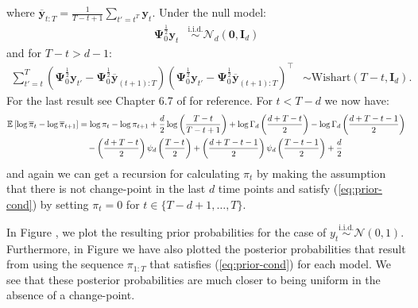 \normalsize
where $\overline{\mathbf{y}}_{t:T} = \frac{1}{T-t+1}\sum_{t'=t^T}\mathbf{y}_t$. Under the null model:
\begin{align*}
    \boldsymbol{\Psi}_0^{\frac{1}{2}}\mathbf{y}_t &\overset{\text{i.i.d.}}{\sim}\mathcal{N}_d(\mathbf{0},\mathbf{I}_d)
\end{align*}
and for $T-t>d-1$:
\begin{align*}
    \sum_{t'=t}^{T} (\boldsymbol{\Psi}^{\frac{1}{2}}_{0}\mathbf{y}_{t'} - \boldsymbol{\Psi}^{\frac{1}{2}}_{0}\overline{\mathbf{y}}_{(t+1):T})(\boldsymbol{\Psi}^{\frac{1}{2}}_{0}\mathbf{y}_{t'} - \boldsymbol{\Psi}^{\frac{1}{2}}_{0}\overline{\mathbf{y}}_{(t+1):T})^\intercal &\sim \text{Wishart}(T-t,\mathbf{I}_d).
\end{align*}
For the last result see Chapter 6.7 of \cite{Chatfield80} for reference.  For $t < T-d$ we now have:
\begin{align*}
    \mathbb{E}\left[\log\overline{\pi}_t - \log \overline{\pi}_{t+1} \right] &= \log \pi_t- \log \pi_{t+1} + \frac{d}{2}\log\left(\frac{T-t}{T-t+1}\right) +\log \Gamma_d\left(\frac{d + T-t}{2}\right) - \log \Gamma_d\left(\frac{d + T-t-1}{2}\right) \\
    &\quad - \left(\frac{d + T - t}{2}\right)\psi_d\left(\frac{T-t}{2}\right) + \left(\frac{d + T - t-1}{2}\right)\psi_d\left(\frac{T-t-1}{2}\right) + \frac{d}{2}
\end{align*}
and again we can get a recursion for calculating $\pi_t$ by making the assumption that there is not change-point in the last $d$ time points and satisfy (\ref{eq:prior-cond}) by setting $\pi_t = 0$ for $t \in \{T-d+1,\ldots,T\}$.


In Figure , we plot the resulting prior probabilities for the case of $y_t \overset{\text{i.i.d.}}{\sim}\mathcal{N}(0,1)$. Furthermore, in Figure we have also plotted the posterior probabilities that result from using the sequence $\pi_{1:T}$ that satisfies (\ref{eq:prior-cond}) for each model. We see that these posterior probabilities are much closer to being uniform in the absence of a change-point. 

